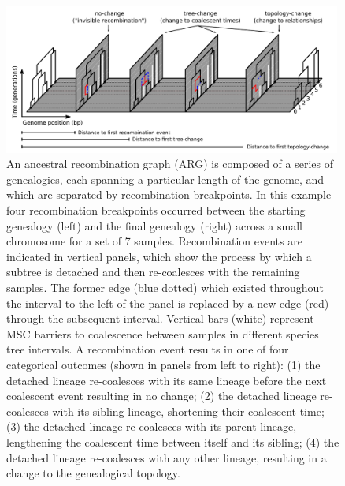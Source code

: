 \documentclass[11pt]{article}
\begin{document}
\begin{figure}[t]
	\centering
	\includegraphics[width=0.99\textwidth]{figures/Fig2-recomb-types-ARG.pdf}
	\caption{
		An ancestral recombination graph (ARG) is composed of 
		a series of genealogies, each spanning a particular length of
		the genome,  
		and which are separated by recombination breakpoints. 
		In this example four recombination breakpoints occurred between the 
		starting genealogy (left) and the final genealogy (right) across a 
		small chromosome for a set of 7 samples. Recombination
		events are indicated in vertical panels, which show the process 
		by which a subtree is detached and then re-coalesces with the 
		remaining samples. The former edge (blue dotted) which existed throughout
		the interval to the left of the panel is replaced by a new edge (red)
		through the subsequent interval. Vertical bars (white) represent 
		MSC barriers to coalescence between samples in different
		species tree intervals.
		A recombination event results in one of four categorical outcomes
		(shown in panels from left to right):
		(1) the detached lineage re-coalesces with its same lineage
		before the next coalescent event resulting in no change; 
		(2) the detached lineage re-coalesces with its sibling lineage,
		shortening their coalescent time;
		(3) the detached lineage re-coalesces with its parent lineage,
		lengthening the coalescent time between itself and its sibling;
		(4) the detached lineage re-coalesces with any other lineage,
		resulting in a change to the genealogical topology.
}
\label{fig:fig2}
\end{figure}
\end{document}
